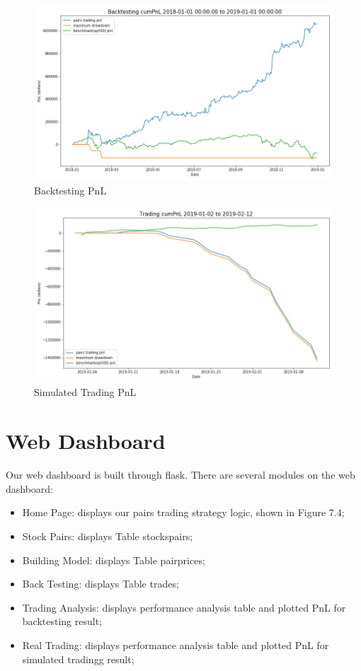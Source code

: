 \begin{figure}
\centering
\includegraphics[scale=0.45]{performance_analysis/images/backtest_pnl.jpg}
\caption{Backtesting PnL}
\label{fig:backtest}
\end{figure}

\begin{figure}
\centering
\includegraphics[scale=0.45]{performance_analysis/images/trade_pnl.jpg}
\caption{Simulated Trading PnL}
\label{fig:trading}
\end{figure}



\section{Web Dashboard}

Our web dashboard is built through flask. There are several modules on the web dashboard:
\begin{itemize}
    \item Home Page: displays our pairs trading strategy logic, shown in Figure 7.4;
    \item Stock Pairs: displays Table stockspairs;
    \item Building Model: displays Table pairprices;
    \item Back Testing: displays Table trades;
    \item Trading Analysis: displays performance analysis table and plotted PnL for backtesting result;
    \item Real Trading: displays performance analysis table and plotted PnL for simulated tradingg result;
\end{itemize}

